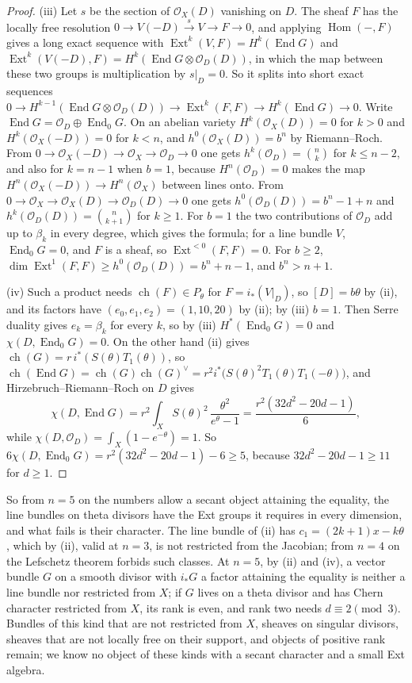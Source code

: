 \documentclass[11pt,reqno]{amsart}
\theoremstyle{plain}
\theoremstyle{definition}
\theoremstyle{remark}
\newcommand{\cO}{\mathcal{O}}
\DeclareMathOperator{\ch}{ch}
\DeclareMathOperator{\End}{End}
\DeclareMathOperator{\Hom}{Hom}
\DeclareMathOperator{\Ext}{Ext}
\begin{document}
\begin{proof}
(iii) Let $s$ be the section of $\cO_{X}(D)$ vanishing on $D$. The sheaf $F$
has the locally free resolution $0\to V(-D)\xrightarrow{s}V\to F\to0$, and
applying $\Hom(-,F)$ gives a long exact sequence with
$\Ext^{k}(V,F)=H^{k}(\End G)$ and $\Ext^{k}(V(-D),F)=H^{k}(\End G\otimes
\cO_{D}(D))$, in which the map between these two groups is multiplication by
$s|_{D}=0$. So it splits into short exact sequences
$0\to H^{k-1}(\End G\otimes\cO_{D}(D))\to\Ext^{k}(F,F)\to H^{k}(\End G)\to0$.
Write $\End G=\cO_{D}\oplus\End_{0}G$. On an abelian variety $H^{k}(\cO_{X}(D))=0$
for $k>0$ and $H^{k}(\cO_{X}(-D))=0$ for $k<n$, and $h^{0}(\cO_{X}(D))=b^{n}$
by Riemann--Roch. From $0\to\cO_{X}(-D)\to\cO_{X}\to\cO_{D}\to0$ one gets
$h^{k}(\cO_{D})=\binom nk$ for $k\le n-2$, and also for $k=n-1$ when $b=1$,
because $H^{n}(\cO_{D})=0$ makes the map $H^{n}(\cO_{X}(-D))\to H^{n}(\cO_{X})$
between lines onto. From $0\to\cO_{X}\to\cO_{X}(D)\to\cO_{D}(D)\to0$ one gets
$h^{0}(\cO_{D}(D))=b^{n}-1+n$ and $h^{k}(\cO_{D}(D))=\binom{n}{k+1}$ for $k\ge1$.
For $b=1$ the two contributions of $\cO_{D}$ add up to $\beta_{k}$ in every
degree, which gives the formula; for a line bundle $V$, $\End_{0}G=0$, and
$F$ is a sheaf, so $\Ext^{<0}(F,F)=0$. For $b\ge2$,
$\dim\Ext^{1}(F,F)\ge h^{0}(\cO_{D}(D))=b^{n}+n-1$, and $b^{n}>n+1$.

(iv) Such a product needs $\ch(F)\in P_{\theta}$ for $F=i_{*}(V|_{D})$, so
$[D]=b\theta$ by (ii), and its factors have
$(e_{0},e_{1},e_{2})=(1,10,20)$ by (ii); by (iii)
$b=1$. Then Serre duality gives $e_{k}=\beta_{k}$ for every $k$, so by (iii)
$H^{*}(\End_{0}G)=0$ and $\chi(D,\End_{0}G)=0$. On the other hand (ii) gives
$\ch(G)=r\,i^{*}(S(\theta)T_{1}(\theta))$, so
$\ch(\End G)=\ch(G)\ch(G)^{\vee}=r^{2}i^{*}\bigl(S(\theta)^{2}T_{1}(\theta)
T_{1}(-\theta)\bigr)$, and Hirzebruch--Riemann--Roch on $D$ gives
\[
  \chi(D,\End G)=r^{2}\int_{X}S(\theta)^{2}\,\frac{\theta^{2}}{e^{\theta}-1}
  =\frac{r^{2}(32d^{2}-20d-1)}{6},
\]
while $\chi(D,\cO_{D})=\int_{X}(1-e^{-\theta})=1$.
So $6\chi(D,\End_{0}G)=r^{2}(32d^{2}-20d-1)-6\ge5$, because
$32d^{2}-20d-1\ge11$ for $d\ge1$.
\end{proof}

So from $n=5$ on the numbers allow a secant object attaining the equality, the
line bundles on theta divisors have the Ext groups it requires in every
dimension, and what fails is their character. The line bundle of
(ii) has $c_{1}=(2k+1)x-k\theta$, which by
(ii), valid at $n=3$, is not restricted from the
Jacobian; from $n=4$ on the Lefschetz theorem forbids such classes. At $n=5$,
by (ii) and (iv), a vector bundle $G$ on a smooth divisor with $i_{*}G$ a
factor attaining the equality is neither a line bundle nor restricted from
$X$; if $G$ lives on a theta divisor and has Chern character restricted from
$X$, its rank is even, and rank two needs $d\equiv2\pmod3$. Bundles of this kind that are not restricted from
$X$, sheaves on singular divisors, sheaves that are not locally free on their
support, and objects of positive rank remain; we know no object of these kinds
with a secant character and a small Ext algebra.
\end{document}
